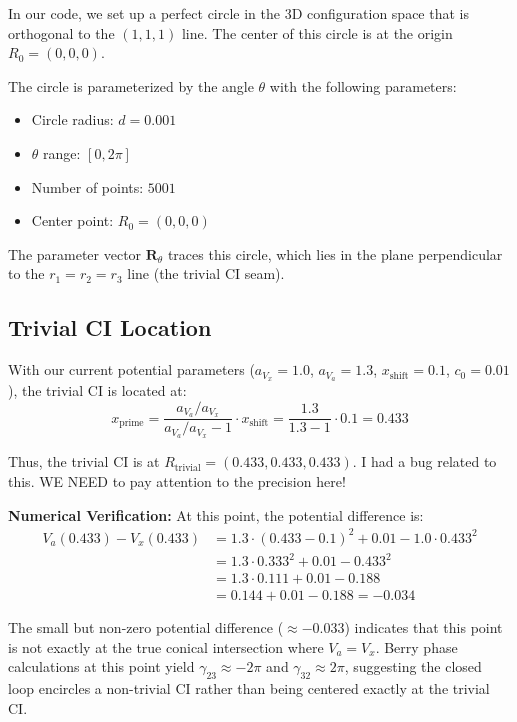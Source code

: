 \documentclass{article}
\begin{document}
In our code, we set up a perfect circle in the 3D configuration space that is orthogonal to the $(1,1,1)$ line. The center of this circle is at the origin $R_0 = (0, 0, 0)$.

The circle is parameterized by the angle $\theta$ with the following parameters:
\begin{itemize}
    \item Circle radius: $d = 0.001$
    \item $\theta$ range: $[0, 2\pi]$
    \item Number of points: $5001$
    \item Center point: $R_0 = (0, 0, 0)$
\end{itemize}

The parameter vector $\bm{R}_\theta$ traces this circle, which lies in the plane perpendicular to the $r_1 = r_2 = r_3$ line (the trivial CI seam).

\subsection{Trivial CI Location}

With our current potential parameters ($a_{V_x} = 1.0$, $a_{V_a} = 1.3$, $x_{\text{shift}} = 0.1$, $c_0 = 0.01$), the trivial CI is located at:
\begin{equation}
x_{\text{prime}} = \frac{a_{V_a}/a_{V_x}}{a_{V_a}/a_{V_x} - 1} \cdot x_{\text{shift}} = \frac{1.3}{1.3 - 1} \cdot 0.1 = 0.433
\end{equation}

Thus, the trivial CI is at $R_{\text{trivial}} = (0.433, 0.433, 0.433)$. I had a bug related to this. WE NEED to pay attention to the precision here!

\textbf{Numerical Verification:} At this point, the potential difference is:
\begin{align}
V_a(0.433) - V_x(0.433) &= 1.3 \cdot (0.433 - 0.1)^2 + 0.01 - 1.0 \cdot 0.433^2 \\
&= 1.3 \cdot 0.333^2 + 0.01 - 0.433^2 \\
&= 1.3 \cdot 0.111 + 0.01 - 0.188 \\
&= 0.144 + 0.01 - 0.188 = -0.034
\end{align}

The small but non-zero potential difference ($\approx -0.033$) indicates that this point is not exactly at the true conical intersection where $V_a = V_x$. Berry phase calculations at this point yield $\gamma_{23} \approx -2\pi$ and $\gamma_{32} \approx 2\pi$, suggesting the closed loop encircles a non-trivial CI rather than being centered exactly at the trivial CI.
\end{document}

